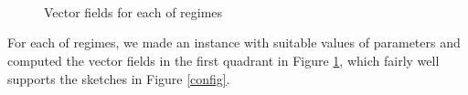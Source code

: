 \documentclass{amsart}
\theoremstyle{definition}
\numberwithin{equation}{section}
\begin{document}
\begin{figure}
\setcounter{subfigure}{0}
 \\
 \\
{} 
 \\
\caption{Vector fields for each of regimes}\label{vectors}
\end{figure}

For each of regimes, we made an instance with suitable values of parameters and computed the vector fields in the first quadrant in Figure \ref{vectors}, which fairly well supports the sketches in Figure \ref{config}.


\end{document}
